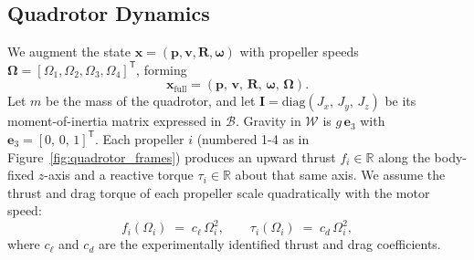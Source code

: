 \subsection{Quadrotor Dynamics}
\label{sec:quadrotor_dynamics}
We augment the state \(\mathbf{x}=(\mathbf{p},\mathbf{v},\mathbf{R},\boldsymbol{\omega})\) with propeller speeds \(\boldsymbol{\Omega}=[\Omega_1,\Omega_2,\Omega_3,\Omega_4]^\mathsf{T}\), forming
\begin{equation}
\mathbf{x}_{\mathrm{full}} = (\mathbf{p},\,\mathbf{v},\,\mathbf{R},\,\boldsymbol{\omega},\,\boldsymbol{\Omega}).
\end{equation}
Let \(m\) be the mass of the quadrotor, and let \(\mathbf{I} = \mathrm{diag}(J_{x},\,J_{y},\,J_{z})\) be its moment-of-inertia matrix expressed in \(\mathcal{B}\). Gravity in \(\mathcal{W}\) is \(g\,\mathbf{e}_{3}\) with \(\mathbf{e}_{3} = [0,\,0,\,1]^{\mathsf{T}}\). Each propeller \(i\) (numbered 1-4 as in Figure~\ref{fig:quadrotor_frames}) produces an upward thrust \(f_{i} \in \mathbb{R}\) along the body-fixed \(z\)-axis and a reactive torque \(\tau_{i}\in \mathbb{R}\) about that same axis. We assume the thrust and drag torque of each propeller scale quadratically with the motor speed:
\begin{equation}
f_{i}(\Omega_{i}) \;=\; c_{\ell}\,\Omega_{i}^{2}, 
\qquad 
\tau_{i}(\Omega_{i}) \;=\; c_{d}\,\Omega_{i}^{2},
\end{equation}
where \(c_{\ell}\) and \(c_{d}\) are the experimentally identified thrust and drag coefficients.

